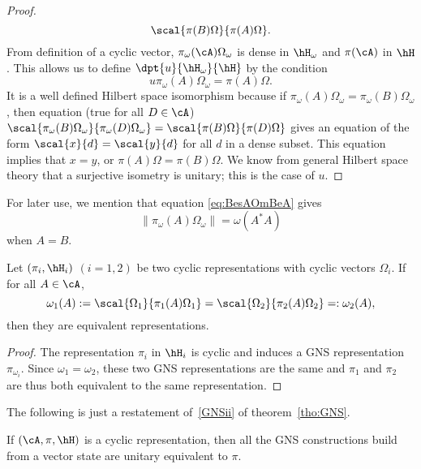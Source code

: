 \begin{proof}
\begin{equation}
		\scal{\pi(B)\Omega}{\pi(A)\Omega}.
	\end{equation}
	From definition of a cyclic vector, $\pi_{\omega}(\cA)\Omega_{\omega}$ is dense in $\hH_{\omega}$ and $\pi(\cA)$ in $\hH$. This allows us to define $\dpt{u}{\hH_{\omega}}{\hH}$ by the condition
	\[
		u\pi_{\omega}(A)\Omega_{\omega}=\pi(A)\Omega.
	\]
	It is a well defined Hilbert space isomorphism because if $\pi_{\omega}(A)\Omega_{\omega}=\pi_{\omega}(B)\Omega_{\omega}$, then equation (true for all $D\in\cA$) $\scal{\pi_{\omega}(B)\Omega_{\omega}}{\pi_{\omega}(D)\Omega_{\omega}}=\scal{\pi(B)\Omega}{\pi(D)\Omega}$ gives an equation of the form $\scal{x}{d}=\scal{y}{d}$ for all $d$ in a dense subset. This equation implies that $x=y$, or $\pi(A)\Omega=\pi(B)\Omega$. We know from general Hilbert space theory that a surjective isometry is unitary; this is the case of $u$.

\end{proof}

For later use, we mention that equation \eqref{eq:BesAOmBeA} gives
\begin{equation}  \label{eq:piomomaesm}
	\| \pi_{\omega}(A)\Omega_{\omega} \|=\omega(A^*A)
\end{equation}
when $A=B$.

\begin{corollary}
	Let $(\pi_i,\hH_i)$ $(i=1,2)$ be two cyclic representations with cyclic vectors $\Omega_i$. If for all $A\in\cA$,
	\[
		\omega_1(A):=\scal{\Omega_1}{\pi_1(A)\Omega_1}=\scal{\Omega_2}{\pi_2(A)\Omega_2}=:\omega_2(A),
	\]
	then they are equivalent representations.

\end{corollary}

\begin{proof}
	The representation $\pi_i$ in $\hH_i$ is cyclic and induces a GNS representation $\pi_{\omega_i}$. Since $\omega_1=\omega_2$, these two GNS representations are the same and $\pi_1$ and $\pi_2$ are thus both equivalent to the same representation.

\end{proof}

The following is just a restatement of~\ref{GNSii} of theorem~\ref{tho:GNS}.
\begin{proposition}
	If $(\cA,\pi,\hH)$ is a cyclic representation, then all the GNS constructions build from a vector state are unitary equivalent to $\pi$. \label{prop:cyclequivGNS}
\end{proposition}


